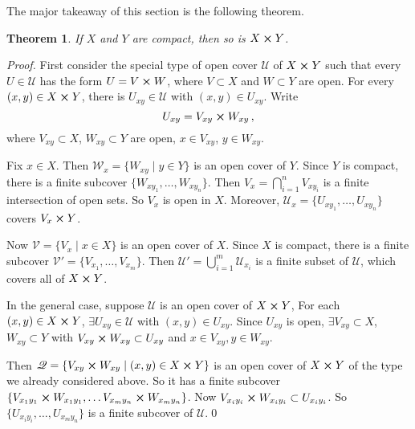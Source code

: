 \documentclass{article}
\theoremstyle{plain}\theoremheaderfont{\normalfont\itshape}\theorembodyfont{\rmfamily}\theoremseparator{.}\newtheorem*{rem}{Remark}\newtheorem*{ex}{Example}\newtheorem*{proof}{Proof}\newtheorem*{altp}{Alternative proof}
\theoremstyle{plain}\theoremheaderfont{\normalfont\bfseries}\theorembodyfont{\rmfamily}\theoremseparator{.}\newtheorem{thm}{Theorem}[section]\newtheorem{lem}[thm]{Lemma}\newtheorem{prop}[thm]{Proposition}\newtheorem*{cor}{Corollary}\newtheorem{defn}[thm]{Definition}\newtheorem{clm}[thm]{Claim}\newtheorem{clminproof}{Claim}
\theoremstyle{break}\theoremheaderfont{\normalfont\itshape}\theorembodyfont{\rmfamily}\theoremseparator{.\medskip}\newtheorem*{proofskip}{Proof}\newtheorem*{exs}{Examples}\newtheorem*{rems}{Remarks}
\theoremstyle{break}\theoremheaderfont{\normalfont\bfseries}\theorembodyfont{\rmfamily}\theoremseparator{.\medskip}\newtheorem{lemskip}[thm]{Lemma}\newtheorem{defnskip}[thm]{Definition}\newtheorem{propskip}[thm]{Proposition}\newtheorem{thmskip}[thm]{Theorem}
\newcommand{\qed}{\hfill\ensuremath{\Box}}
\begin{document}
    The major takeaway of this section is the following theorem.
    \begin{thm}
        If \(X\) and \(Y\) are compact, then so is \(X\cross Y\).
    \end{thm}
    \begin{proof}
        First consider the special type of open cover \(\mathscr{U}\) of \(X\cross Y\) such that every \(U\in\mathscr{U}\) has the form \(U=V\cross W\), where \(V\subset X\) and \(W\subset Y\) are open. For every \((x,y)\in X\cross Y\), there is \(U_{xy}\in\mathscr{U}\) with \((x,y)\in U_{xy}\). Write
        \[U_{xy}=V_{xy}\cross W_{xy}\,,\]
        where \(V_{xy}\subset X\), \(W_{xy}\subset Y\) are open, \(x\in V_{xy}\), \(y\in W_{xy}\).

        Fix \(x\in X\). Then \(\mathscr{W}_x=\{W_{xy}\mid y\in Y\}\) is an open cover of \(Y\). Since \(Y\) is compact, there is a finite subcover \(\{W_{xy_1},\dots,W_{xy_n}\}\). Then \(V_x=\bigcap_{i=1}^{n}V_{xy_i}\) is a finite intersection of open sets. So \(V_x\) is open in \(X\). Moreover, \(\mathscr{U}_x=\{U_{xy_1},\dots,U_{xy_n}\}\) covers \(V_x\cross Y\).

        \begin{center}
        \end{center}

        Now \(\mathscr{V}=\{V_x\mid x\in X\}\) is an open cover of \(X\). Since \(X\) is compact, there is a finite subcover \(\mathscr{V}'=\{V_{x_1},\dots,V_{x_m}\}\). Then \(\mathscr{U}'=\bigcup_{i=1}^{m}\mathscr{U}_{x_i}\) is a finite subset of \(\mathscr{U}\), which covers all of \(X\cross Y\).

        In the general case, suppose \(\mathscr{U}\) is an open cover of \(X\cross Y\), For each \((x,y)\in X\cross Y\), \(\exists U_{xy}\in\mathscr{U}\) with \((x,y)\in U_{xy}\). Since \(U_{xy}\) is open, \(\exists V_{xy}\subset X\), \(W_{xy}\subset Y\) with \(V_{xy}\cross W_{xy}\subset U_{xy}\) and \(x\in V_{xy},y\in W_{xy}\).

        Then \(\mathscr{Q}=\{V_{xy}\cross W_{xy}\mid (x,y)\in X\cross Y\}\) is an open cover of \(X\cross Y\) of the type we already considered above. So it has a finite subcover \(\{V_{x_1y_1}\cross W_{x_1y_1},\dots V_{x_my_n}\cross W_{x_my_n}\}\). Now \(V_{x_iy_i}\cross W_{x_iy_i}\subset U_{x_iy_i}\). So \(\{U_{x_iy_i},\dots,U_{x_my_n}\}\) is a finite subcover of \(\mathscr{U}\).\qed
    \end{proof}
\end{document}
